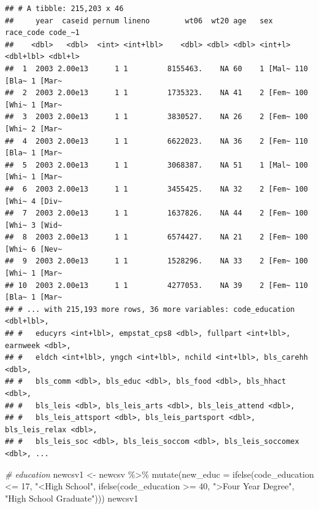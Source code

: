 \documentclass[
]{article}
\newenvironment{Shaded}{\begin{snugshade}}{\end{snugshade}}
\newcommand{\AttributeTok}[1]{\textcolor[rgb]{0.77,0.63,0.00}{#1}}
\newcommand{\CommentTok}[1]{\textcolor[rgb]{0.56,0.35,0.01}{\textit{#1}}}
\newcommand{\DecValTok}[1]{\textcolor[rgb]{0.00,0.00,0.81}{#1}}
\newcommand{\FunctionTok}[1]{\textcolor[rgb]{0.00,0.00,0.00}{#1}}
\newcommand{\NormalTok}[1]{#1}
\newcommand{\OtherTok}[1]{\textcolor[rgb]{0.56,0.35,0.01}{#1}}
\newcommand{\SpecialCharTok}[1]{\textcolor[rgb]{0.00,0.00,0.00}{#1}}
\newcommand{\StringTok}[1]{\textcolor[rgb]{0.31,0.60,0.02}{#1}}
\begin{document}
\begin{verbatim}
## # A tibble: 215,203 x 46
##     year  caseid pernum lineno        wt06  wt20 age   sex     race_code code_~1
##    <dbl>   <dbl>  <int> <int+lbl>    <dbl> <dbl> <dbl> <int+l> <dbl+lbl> <dbl+l>
##  1  2003 2.00e13      1 1         8155463.    NA 60    1 [Mal~ 110 [Bla~ 1 [Mar~
##  2  2003 2.00e13      1 1         1735323.    NA 41    2 [Fem~ 100 [Whi~ 1 [Mar~
##  3  2003 2.00e13      1 1         3830527.    NA 26    2 [Fem~ 100 [Whi~ 2 [Mar~
##  4  2003 2.00e13      1 1         6622023.    NA 36    2 [Fem~ 110 [Bla~ 1 [Mar~
##  5  2003 2.00e13      1 1         3068387.    NA 51    1 [Mal~ 100 [Whi~ 1 [Mar~
##  6  2003 2.00e13      1 1         3455425.    NA 32    2 [Fem~ 100 [Whi~ 4 [Div~
##  7  2003 2.00e13      1 1         1637826.    NA 44    2 [Fem~ 100 [Whi~ 3 [Wid~
##  8  2003 2.00e13      1 1         6574427.    NA 21    2 [Fem~ 100 [Whi~ 6 [Nev~
##  9  2003 2.00e13      1 1         1528296.    NA 33    2 [Fem~ 100 [Whi~ 1 [Mar~
## 10  2003 2.00e13      1 1         4277053.    NA 39    2 [Fem~ 110 [Bla~ 1 [Mar~
## # ... with 215,193 more rows, 36 more variables: code_education <dbl+lbl>,
## #   educyrs <int+lbl>, empstat_cps8 <dbl>, fullpart <int+lbl>, earnweek <dbl>,
## #   eldch <int+lbl>, yngch <int+lbl>, nchild <int+lbl>, bls_carehh <dbl>,
## #   bls_comm <dbl>, bls_educ <dbl>, bls_food <dbl>, bls_hhact <dbl>,
## #   bls_leis <dbl>, bls_leis_arts <dbl>, bls_leis_attend <dbl>,
## #   bls_leis_attsport <dbl>, bls_leis_partsport <dbl>, bls_leis_relax <dbl>,
## #   bls_leis_soc <dbl>, bls_leis_soccom <dbl>, bls_leis_soccomex <dbl>, ...
\end{verbatim}

\begin{Shaded}
\begin{Highlighting}[]
\CommentTok{\# education}
\NormalTok{newcsv1 }\OtherTok{\textless{}{-}}\NormalTok{ newcsv }\SpecialCharTok{\%\textgreater{}\%}
  \FunctionTok{mutate}\NormalTok{(}\AttributeTok{new\_educ =} \FunctionTok{ifelse}\NormalTok{(code\_education }\SpecialCharTok{\textless{}=} \DecValTok{17}\NormalTok{, }\StringTok{"\textless{}High School"}\NormalTok{, }\FunctionTok{ifelse}\NormalTok{(code\_education }\SpecialCharTok{\textgreater{}=} \DecValTok{40}\NormalTok{, }\StringTok{"\textgreater{}Four Year Degree"}\NormalTok{, }\StringTok{"High School Graduate"}\NormalTok{)))}
\NormalTok{  newcsv1}
\end{Highlighting}
\end{Shaded}
\end{document}
